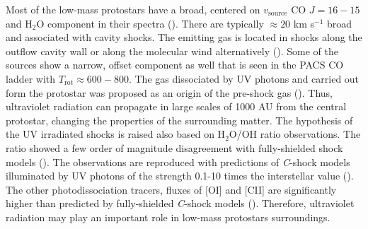 \documentclass{aa}
\begin{document}
Most of the low-mass protostars have a broad, centered on $v_{\mathrm{source}}$ CO $J=16-15$ and
H$_2$O component in their spectra (\citealt{Kri17}). There are typically $\approx 20$ km s$^{-1}$
broad and associated with cavity shocks. The emitting gas is located in shocks along the outflow
cavity wall or along the molecular wind alternatively (\citealt{Yva16}). Some of the sources show a
narrow, offset component as well that is seen in the PACS CO ladder with $T_\mathrm{rot} \approx
600-800$. The gas dissociated by UV photons and carried out form the protostar was proposed as an
origin of the pre-shock gas (\citealt{Kri17}). Thus, ultraviolet radiation can propagate in large
scales of 1000 AU from the central protostar, changing the properties of the surrounding matter. The
hypothesis of the UV irradiated shocks is raised also based on H$_2$O/OH ratio observations. The
ratio showed a few order of magnitude disagreement with fully-shielded shock models
(\citealt{Kar14}). The observations are reproduced with predictions of \textit{C}-shock models
illuminated by UV photons of the strength 0.1-10 times the interstellar value (\citealt{Mel15}). The
other photodissociation tracers, fluxes of [OI] and [CII] are significantly higher than predicted by
fully-shielded \textit{C}-shock models (\citealt{Kar18}). Therefore, ultraviolet radiation may play
an important role in low-mass protostars surroundings.

\end{document}
